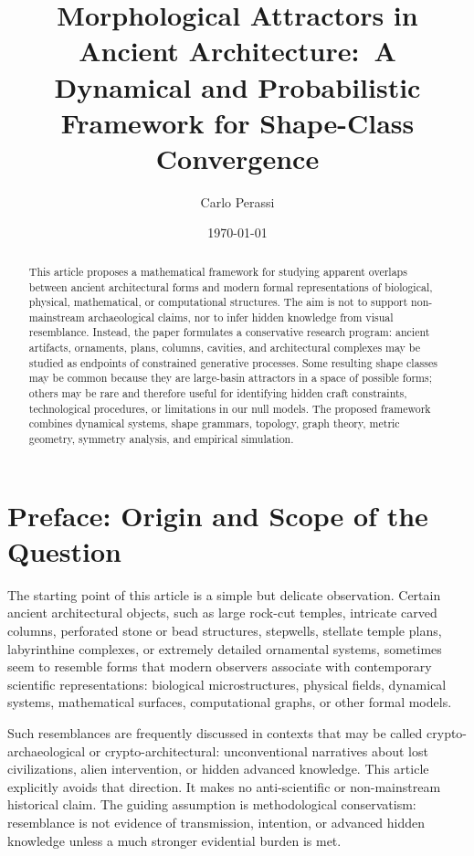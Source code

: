 \documentclass[11pt,a4paper]{article}
\title{Morphological Attractors in Ancient Architecture:\
A Dynamical and Probabilistic Framework for Shape-Class Convergence}
\author{Carlo Perassi}
\date{\today}
\begin{document}
\maketitle

\begin{abstract}
This article proposes a mathematical framework for studying apparent overlaps between ancient architectural forms and modern formal representations of biological, physical, mathematical, or computational structures. The aim is not to support non-mainstream archaeological claims, nor to infer hidden knowledge from visual resemblance. Instead, the paper formulates a conservative research program: ancient artifacts, ornaments, plans, columns, cavities, and architectural complexes may be studied as endpoints of constrained generative processes. Some resulting shape classes may be common because they are large-basin attractors in a space of possible forms; others may be rare and therefore useful for identifying hidden craft constraints, technological procedures, or limitations in our null models. The proposed framework combines dynamical systems, shape grammars, topology, graph theory, metric geometry, symmetry analysis, and empirical simulation.
\end{abstract}

\section*{Preface: Origin and Scope of the Question}

The starting point of this article is a simple but delicate observation. Certain ancient architectural objects, such as large rock-cut temples, intricate carved columns, perforated stone or bead structures, stepwells, stellate temple plans, labyrinthine complexes, or extremely detailed ornamental systems, sometimes seem to resemble forms that modern observers associate with contemporary scientific representations: biological microstructures, physical fields, dynamical systems, mathematical surfaces, computational graphs, or other formal models.

Such resemblances are frequently discussed in contexts that may be called crypto-archaeological or crypto-architectural: unconventional narratives about lost civilizations, alien intervention, or hidden advanced knowledge. This article explicitly avoids that direction. It makes no anti-scientific or non-mainstream historical claim. The guiding assumption is methodological conservatism: resemblance is not evidence of transmission, intention, or advanced hidden knowledge unless a much stronger evidential burden is met.
\end{document}
